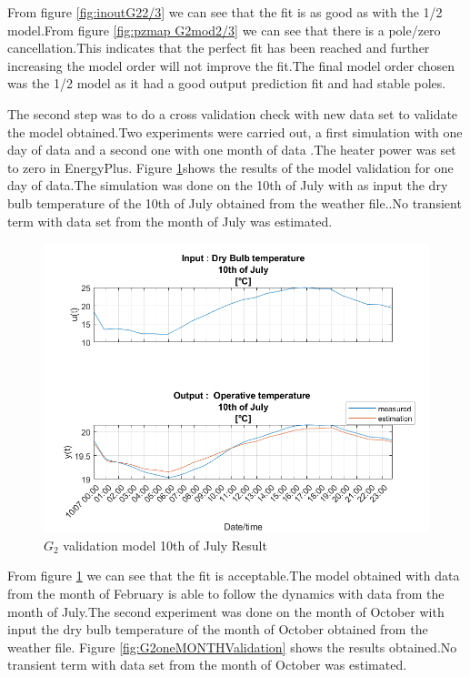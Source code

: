 \documentclass[a4paper,12pt]{article}
\numberwithin{equation}{section}
\begin{document}
\noindent
From figure \ref{fig:inoutG22/3} we can see that the fit is as good as with the 1/2 model.From figure \ref{fig:pzmap G2mod2/3} we can see that there is a pole/zero cancellation.This indicates that the perfect fit has been reached and further increasing the model order will not improve the fit.The final model order chosen was the 1/2 model as it had a good  output prediction fit and had stable poles.

The second step was to do a cross validation check with new data set to validate the model obtained.Two  experiments were carried out, a first simulation with one day of data and a second one with one month of data .The heater power was set to zero in  EnergyPlus. Figure \ref{fig:G2onedayValidation10/07}shows the results of the model validation for one day of data.The simulation was done on the 10th of July with as input the dry bulb temperature of the 10th of July obtained from the weather file..No transient term with data set from the month of July was estimated.

\begin{figure}[H]
    \includegraphics[width=\textwidth]{G2_10_07.png}
    \centering
    \caption{$G_{2}$ validation model 10th of July  Result}
    \label{fig:G2onedayValidation10/07}
\end{figure}

\noindent
From  figure \ref{fig:G2onedayValidation10/07} we can see that the fit is acceptable.The model obtained with data from the month of February is able to follow the dynamics with data from the month of July.The second experiment was  done on the month of October with input the dry bulb temperature of the month of October obtained from the weather file. Figure \ref{fig:G2oneMONTHValidation} shows the results obtained.No transient term with data set from the month of October was estimated.
\end{document}
